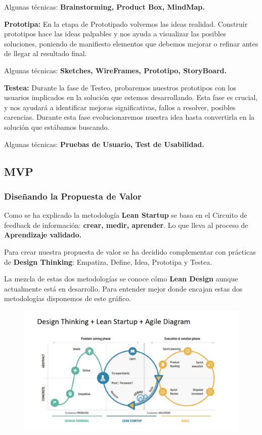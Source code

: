 \documentclass[12pt,twoside,titlepage]{report}
\begin{document}
Algunas técnicas: \textbf{Brainstorming, Product Box, MindMap.}

\textbf{Prototipa:} En la etapa de Prototipado volvemos las ideas realidad. Construir prototipos hace las ideas palpables y nos ayuda a visualizar las posibles soluciones, poniendo de manifiesto elementos que debemos mejorar o refinar antes de llegar al resultado final.

Algunas técnicas: \textbf{Sketches, WireFrames, Prototipo, StoryBoard.}

\textbf{Testea:} Durante la fase de Testeo, probaremos nuestros prototipos con los usuarios implicados en la solución que estemos desarrollando. Esta fase es crucial, y nos ayudará a identificar mejoras significativas, fallos a resolver, posibles carencias. Durante esta fase evolucionaremos nuestra idea hasta convertirla en la solución que estábamos buscando.

Algunas técnicas: \textbf{Pruebas de Usuario, Test de Usabilidad.}

\subsection{MVP}
\subsubsection{Diseñando la Propuesta de Valor}

Como se ha explicado la metodología \textbf{Lean Startup} se basa en el Circuito de feedback de información: \textbf{crear, medir, aprender}. Lo que lleva al proceso de \textbf{Aprendizaje validado.}

Para crear nuestra propuesta de valor se ha decidido complementar con prácticas de \textbf{Design Thinking}: Empatiza, Define, Idea, Prototipa y Testea.

La mezcla de estas dos metodologías se conoce cómo \textbf{Lean Design} aunque actualmente está en desarrollo. Para entender mejor donde encajan estas dos metodologías disponemos de este gráfico.

\begin{figure}[H] 
    \includegraphics[scale=0.3]{leandesignagile}
    \centering
    \label{fig:Lean Design Agile}
\end{figure}
\end{document}
